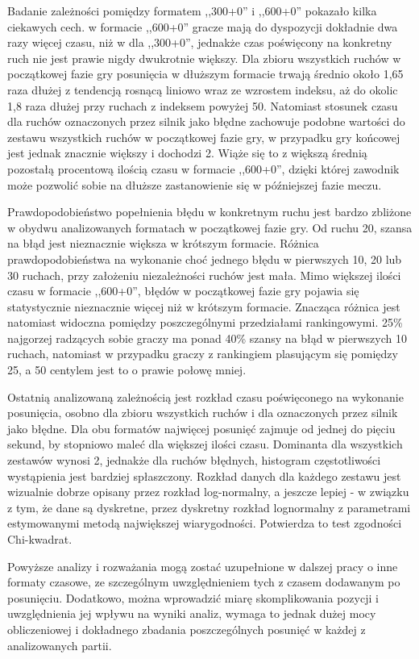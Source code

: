 \documentclass[inzynierska]{pwr_wmat_praca_dyplomowa}
\theoremstyle{plain}
\numberwithin{theorem}{chapter}
\theoremstyle{definition}
\numberwithin{theorem}{chapter}
\begin{document}
Badanie zależności pomiędzy formatem ,,300+0'' i ,,600+0'' pokazało kilka ciekawych cech. w formacie ,,600+0'' gracze mają do dyspozycji dokładnie dwa razy więcej czasu, niż w dla ,,300+0'', jednakże czas poświęcony na konkretny ruch nie jest prawie nigdy dwukrotnie większy. Dla zbioru wszystkich ruchów w początkowej fazie gry posunięcia w dłuższym formacie trwają średnio około 1,65 raza dłużej z tendencją rosnącą liniowo wraz ze wzrostem indeksu, aż do okolic 1,8 raza dłużej przy ruchach z indeksem powyżej 50. Natomiast stosunek czasu dla ruchów oznaczonych przez silnik jako błędne zachowuje podobne wartości do zestawu wszystkich ruchów w początkowej fazie gry, w przypadku gry końcowej jest jednak znacznie większy i dochodzi 2. Wiąże się to z większą średnią pozostałą procentową ilością czasu w formacie ,,600+0'', dzięki której zawodnik może pozwolić sobie na dłuższe zastanowienie się w późniejszej fazie meczu.

Prawdopodobieństwo popełnienia błędu w konkretnym ruchu jest bardzo zbliżone w obydwu analizowanych formatach w początkowej fazie gry. Od ruchu 20, szansa na błąd jest nieznacznie większa w krótszym formacie. Różnica prawdopodobieństwa na wykonanie choć jednego błędu w pierwszych 10, 20 lub 30 ruchach, przy założeniu niezależności ruchów jest mała. Mimo większej ilości czasu w formacie ,,600+0'', błędów w początkowej fazie gry pojawia się statystycznie nieznacznie więcej niż w krótszym formacie. Znacząca różnica jest natomiast widoczna pomiędzy poszczególnymi przedziałami rankingowymi. 25\% najgorzej radzących sobie graczy ma ponad 40\% szansy na błąd w pierwszych 10 ruchach, natomiast w przypadku graczy z rankingiem plasującym się pomiędzy 25, a 50 centylem jest to o prawie połowę mniej.

Ostatnią analizowaną zależnością jest rozkład czasu poświęconego na wykonanie posunięcia, osobno dla zbioru wszystkich ruchów i dla oznaczonych przez silnik jako błędne. Dla obu formatów najwięcej posunięć zajmuje od jednej do pięciu sekund, by stopniowo maleć dla większej ilości czasu. Dominanta dla wszystkich zestawów wynosi 2, jednakże dla ruchów błędnych, histogram częstotliwości wystąpienia jest bardziej spłaszczony. Rozkład danych dla każdego zestawu jest wizualnie dobrze opisany przez rozkład log-normalny, a jeszcze lepiej - w związku z tym, że dane są dyskretne, przez dyskretny rozkład lognormalny z parametrami estymowanymi metodą największej wiarygodności. Potwierdza to test zgodności Chi-kwadrat.

Powyższe analizy i rozważania mogą zostać uzupełnione w dalszej pracy o inne formaty czasowe, ze szczególnym uwzględnieniem tych z czasem dodawanym po posunięciu. Dodatkowo, można wprowadzić miarę skomplikowania pozycji i uwzględnienia jej wpływu na wyniki analiz, wymaga to jednak dużej mocy obliczeniowej i dokładnego zbadania poszczególnych posunięć w każdej z analizowanych partii.
\end{document}
